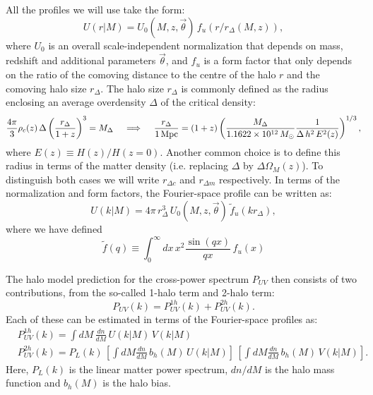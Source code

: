 \documentclass{article}
\begin{document}
All the profiles we will use take the form:
\begin{equation}
  U(r|M)=U_0(M,z,\vec{\theta})\,f_u(r/r_\Delta(M,z)),
\end{equation}
where $U_0$ is an overall scale-independent normalization that depends on mass, redshift and additional parameters $\vec{\theta}$, and $f_u$ is a form factor that only depends on the ratio of the comoving distance to the centre of the halo $r$ and the comoving halo size $r_\Delta$. The halo size $r_\Delta$ is commonly defined as the radius enclosing an average overdensity $\Delta$ of the critical density:
\begin{equation}
  \frac{4\pi}{3}\rho_c(z)\,\Delta\left(\frac{r_\Delta}{1+z}\right)^3=M_\Delta
  \hspace{12pt}\Longrightarrow\hspace{12pt}
  \frac{r_\Delta}{1\,{\rm Mpc}}=(1+z)\left(\frac{M_\Delta}{1.1622\times10^{12}\,M_\odot}\frac{1}{\Delta\,h^2\,E^2(z)}\right)^{1/3},
\end{equation}
where $E(z)\equiv H(z)/H(z=0)$. Another common choice is to define this radius in terms of the matter density (i.e. replacing $\Delta$ by $\Delta\Omega_M(z)$). To distinguish both cases we will write $r_{\Delta c}$ and $r_{\Delta m}$ respectively. In terms of the normalization and form factors, the Fourier-space profile can be written as:
\begin{equation}
  U(k|M)=4\pi\,r_\Delta^3\,U_0(M,z,\vec{\theta})\,\tilde{f}_u(kr_\Delta),
\end{equation}
where we have defined
\begin{equation}
  \tilde{f}(q)\equiv\int_0^\infty dx\,x^2\frac{\sin(q x)}{q x}\,f_u(x)
\end{equation}

The halo model prediction for the cross-power spectrum $P_{UV}$ then consists of two contributions, from the so-called 1-halo term and 2-halo term:
\begin{equation}
  P_{UV}(k)=P^{1h}_{UV}(k)+P^{2h}_{UV}(k).
\end{equation}
Each of these can be estimated in terms of the Fourier-space profiles as:
\begin{align}
  &P^{1h}_{UV}(k)=\int dM\,\frac{dn}{dM}\,U(k|M)\,V(k|M)\\
  &P^{2h}_{UV}(k)=P_L(k)\,\left[\int dM\frac{dn}{dM}\,b_h(M)\,U(k|M)\right]\,\left[\int dM\frac{dn}{dM}\,b_h(M)\,V(k|M)\right].
\end{align}
Here, $P_L(k)$ is the linear matter power spectrum, $dn/dM$ is the halo mass function and $b_h(M)$ is the halo bias.
\end{document}
